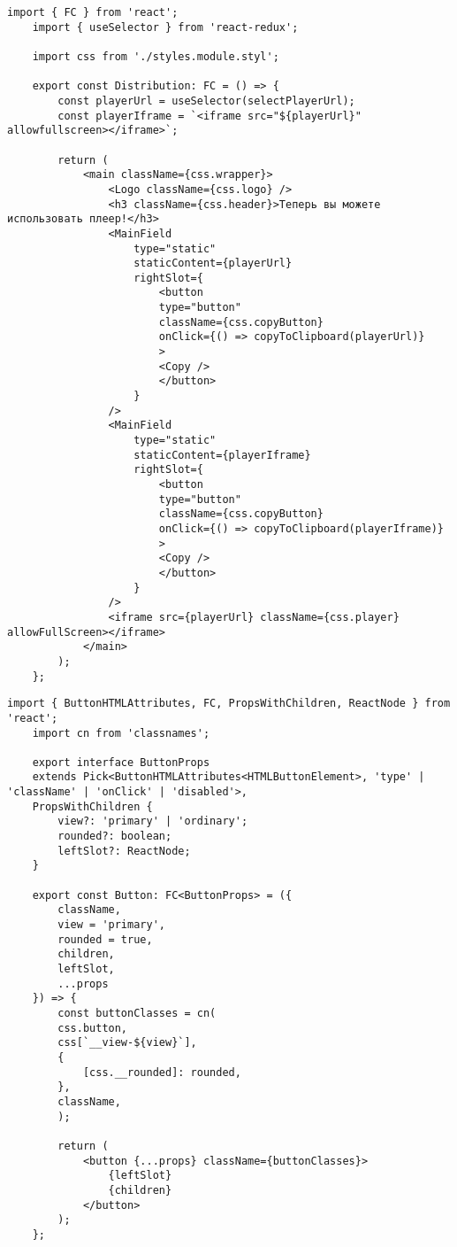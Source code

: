\begin{lstlisting}[caption={Distribution.tsx}]
	import { FC } from 'react';
	import { useSelector } from 'react-redux';
	
	import css from './styles.module.styl';
	
	export const Distribution: FC = () => {
		const playerUrl = useSelector(selectPlayerUrl);
		const playerIframe = `<iframe src="${playerUrl}" allowfullscreen></iframe>`;
		
		return (
			<main className={css.wrapper}>
				<Logo className={css.logo} />
				<h3 className={css.header}>Теперь вы можете использовать плеер!</h3>
				<MainField
					type="static"
					staticContent={playerUrl}
					rightSlot={
						<button
						type="button"
						className={css.copyButton}
						onClick={() => copyToClipboard(playerUrl)}
						>
						<Copy />
						</button>
					}
				/>
				<MainField
					type="static"
					staticContent={playerIframe}
					rightSlot={
						<button
						type="button"
						className={css.copyButton}
						onClick={() => copyToClipboard(playerIframe)}
						>
						<Copy />
						</button>
					}
				/>
				<iframe src={playerUrl} className={css.player} allowFullScreen></iframe>
			</main>
		);
	};
\end{lstlisting}

\begin{lstlisting}[caption={Button.tsx}]
	import { ButtonHTMLAttributes, FC, PropsWithChildren, ReactNode } from 'react';
	import cn from 'classnames';
	
	export interface ButtonProps
	extends Pick<ButtonHTMLAttributes<HTMLButtonElement>, 'type' | 'className' | 'onClick' | 'disabled'>,
	PropsWithChildren {
		view?: 'primary' | 'ordinary';
		rounded?: boolean;
		leftSlot?: ReactNode;
	}
	
	export const Button: FC<ButtonProps> = ({
		className,
		view = 'primary',
		rounded = true,
		children,
		leftSlot,
		...props
	}) => {
		const buttonClasses = cn(
		css.button,
		css[`__view-${view}`],
		{
			[css.__rounded]: rounded,
		},
		className,
		);
		
		return (
			<button {...props} className={buttonClasses}>
				{leftSlot}
				{children}
			</button>
		);
	};
\end{lstlisting}

